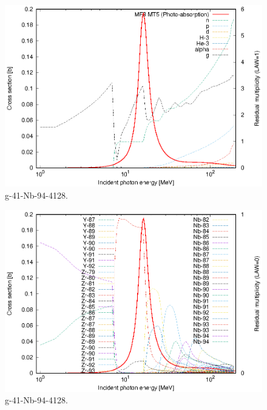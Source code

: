\begin{figure}
 \includegraphics[width=\linewidth]{eps/g_41-Nb-94_4128.eps}
  \caption{g-41-Nb-94-4128.}
\end{figure}
\begin{figure}
 \includegraphics[width=\linewidth]{eps-law0/g_41-Nb-94_4128.eps}
 \caption{g-41-Nb-94-4128.}
\end{figure}
\newpage \clearpage

